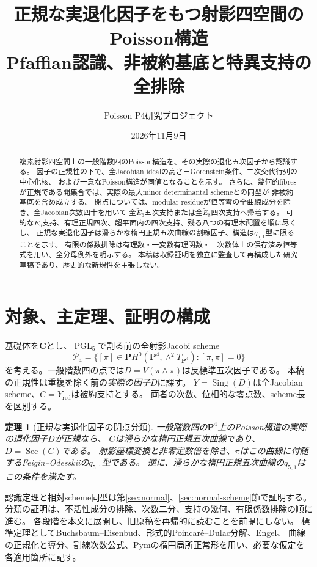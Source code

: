 \documentclass[11pt,a4paper]{ltjsarticle}
\title{正規な実退化因子をもつ射影四空間のPoisson構造\\
\large Pfaffian認識、非被約基底と特異支持の全排除}
\author{Poisson P4研究プロジェクト}
\date{2026年11月9日}
\newcommand{\CC}{\mathbf C}\newcommand{\QQ}{\mathbf Q}
\newcommand{\PP}{\mathbf P}\renewcommand{\AA}{\mathbf A}
\newcommand{\cP}{\mathscr P_4}\newcommand{\dd}{\mathrm d}
\DeclareMathOperator{\PGL}{PGL}\DeclareMathOperator{\GL}{GL}
\newtheorem{theorem}{定理}[section]
\theoremstyle{remark}\newtheorem{remark}[theorem]{注意}
\begin{document}
\maketitle
\begin{abstract}
複素射影四空間上の一般階数四のPoisson構造を、その実際の退化五次因子から認識する。
因子の正規性の下で、全Jacobian idealの高さ三Gorenstein条件、二次交代行列の中心化核、
および一意なPoisson構造が同値となることを示す。
さらに、幾何的fibresが正規である開集合では、実際の最大minor determinantal schemeとの同型が
非被約基底を含め成立する。
閉点については、modular residueが恒等零の全曲線成分を除き、全Jacobian次数四十を用いて
全$\widetilde E_6$五次支持または全$\widetilde E_8$四次支持へ帰着する。
可約な$E_6$支持、有理正規四次、超平面内の四次支持、残る八つの有理木配置を順に尽くし、
正規な実退化因子は滑らかな楕円正規五次曲線の割線因子、構造は$q_{5,1}$型に限ることを示す。
有限の係数排除は有理数・一変数有理関数・二次数体上の保存済み恒等式を用い、全分母例外を明示する。
本稿は収録証明を独立に監査して再構成した研究草稿であり、歴史的な新規性を主張しない。
\end{abstract}
\tableofcontents
\section{対象、主定理、証明の構成}
基礎体を$\CC$とし、$\PGL_5$で割る前の全射影Jacobi scheme
\[
\cP=\{[\pi]\in\PP H^0(\PP^4,\wedge^2T_{\PP^4}):[\pi,\pi]=0\}
\]
を考える。一般階数四の点では$D=V(\pi\wedge\pi)$は反標準五次因子である。
本稿の正規性は重複を除く前の\emph{実際の因子}$D$に課す。
$Y=\operatorname{Sing}(D)$は全Jacobian scheme、$C=Y_{\mathrm{red}}$は被約支持とする。
両者の次数、位相的な零点数、scheme長を区別する。
\begin{theorem}[正規な実退化因子の閉点分類]\label{thm:classification}
一般階数四の$\PP^4$上のPoisson構造の実際の退化因子$D$が正規なら、
$C$は滑らかな楕円正規五次曲線であり、$D=\operatorname{Sec}(C)$である。
射影座標変換と非零定数倍を除き、$\pi$はこの曲線に付随するFeigin--Odesskiiの$q_{5,1}$型である。
逆に、滑らかな楕円正規五次曲線の$q_{5,1}$はこの条件を満たす。
\end{theorem}
認識定理と相対scheme同型は第\ref{sec:normal}、\ref{sec:normal-scheme}節で証明する。
分類の証明は、不活性成分の排除、次数二分、支持の幾何、有限係数排除の順に進む。
各段階を本文に展開し、旧原稿を再帰的に読むことを前提にしない。
標準定理としてBuchsbaum--Eisenbud、形式的Poincar\'e--Dulac分解、Engel、
曲線の正規化と導分、割線次数公式、Pymの楕円局所正常形を用い、必要な仮定を各適用箇所に記す。
\end{document}
